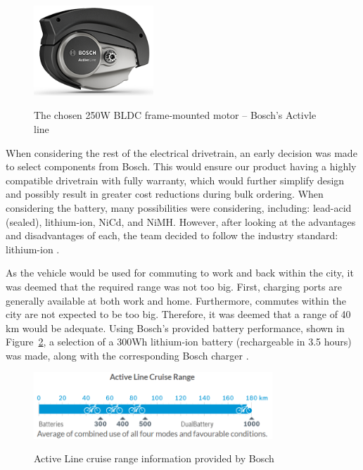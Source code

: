 \documentclass[a4paper,11pt]{article}
\begin{document}
\begin{figure}[!ht]
	\centering
	\includegraphics[width=0.4\textwidth]{bosmot}
	\caption{The chosen 250W BLDC frame-mounted motor -- Bosch's Activle line}
	\cite{bosch18}
	\label{fig:bosmot}
\end{figure}

When considering the rest of the electrical drivetrain, an early decision was made to select components from Bosch. This would ensure our product having a highly compatible drivetrain with fully warranty, which would further simplify design and possibly result in greater cost reductions during bulk ordering. When considering the battery, many possibilities were considering, including: lead-acid (sealed), lithium-ion, NiCd, and NiMH. However, after looking at the advantages and disadvantages of each, the team decided to follow the industry standard: lithium-ion \cite{rag14}. 

As the vehicle would be used for commuting to work and back within the city, it was deemed that the required range was not too big. First, charging ports are generally available at both work and home. Furthermore, commutes within the city are not expected to be too big. Therefore, it was deemed that a range of 40 km would be adequate. Using Bosch's provided battery performance, shown in Figure~\ref{fig:crura}, a selection of a 300Wh lithium-ion battery (rechargeable in 3.5 hours) was made, along with the corresponding Bosch charger \cite{bosch18}.

\begin{figure}[ht]
	\centering
	\includegraphics[width=0.8\textwidth]{crura}
	\caption{Active Line cruise range information provided by Bosch}
	\cite{bosch18}
	\label{fig:crura}
\end{figure}
\end{document}
